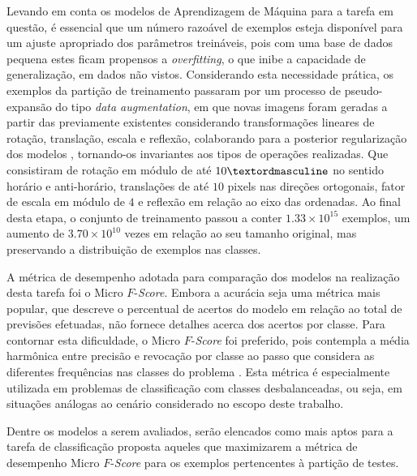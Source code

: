 Levando em conta os modelos de Aprendizagem de Máquina para a tarefa em questão, é essencial que um número razoável de exemplos esteja disponível para um ajuste apropriado dos parâmetros treináveis, pois com uma base de dados pequena estes ficam propensos a \textit{overfitting}, o que inibe a capacidade de generalização, em dados não vistos\cite{DBLP:journals/corr/abs-1708-06020}. Considerando esta necessidade prática, os exemplos da partição de treinamento passaram por um processo de pseudo-expansão do tipo \emph{data augmentation}, em que novas imagens foram geradas a partir das previamente existentes considerando transformações lineares de rotação, translação, escala e reflexão, colaborando para a posterior regularização dos modelos \cite{Chollet:Livro}, tornando-os invariantes aos tipos de operações realizadas\cite{DBLP:journals/corr/abs-1708-06020}. Que consistiram de rotação em módulo de até $10\textordmasculine$ no sentido horário e anti-horário, translações de até $10$ pixels nas direções ortogonais, fator de escala em módulo de $4$ e reflexão em relação ao eixo das ordenadas. Ao final desta etapa, o conjunto de treinamento passou a conter $1.33\times10^{15}$ exemplos, um aumento de $3.70\times10^{10}$ vezes em relação ao seu tamanho original, mas preservando a distribuição de exemplos nas classes.

A métrica de desempenho adotada para comparação dos modelos na realização desta tarefa foi o Micro $F$-\emph{Score}. Embora a acurácia seja uma métrica mais popular, que descreve o percentual de acertos do modelo em relação ao total de previsões efetuadas, não fornece detalhes acerca dos acertos por classe. Para contornar esta dificuldade, o Micro $F$-\emph{Score} foi preferido, pois contempla a média harmônica entre precisão e revocação por classe ao passo que considera as diferentes frequências nas classes do problema \cite{Kubat:Livro}. Esta métrica é especialmente utilizada em problemas de classificação com classes desbalanceadas, ou seja, em situações análogas ao cenário considerado no escopo deste trabalho.

Dentre os modelos a serem avaliados, serão elencados como mais aptos para a tarefa de classificação proposta aqueles que maximizarem a métrica de desempenho Micro $F$-\emph{Score}  para os exemplos pertencentes à partição de testes.
